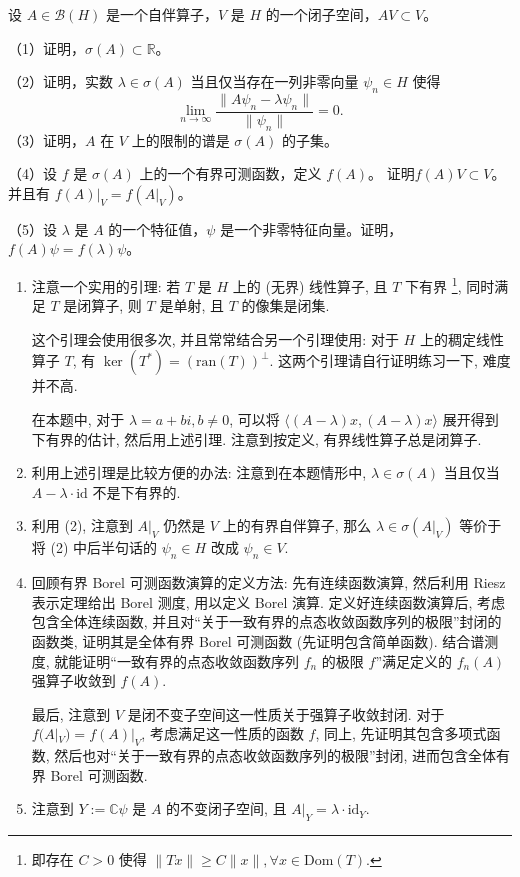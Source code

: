 \begin{3}
设 $A \in \mathcal{B}(H)$ 是一个自伴算子，$V$ 是 $H$ 的一个闭子空间，$A V \subset V$。

（1）证明，$\sigma(A) \subset \mathbb{R}$。

（2）证明，实数 $\lambda \in \sigma(A)$ 当且仅当存在一列非零向量 $\psi_{n} \in H$ 使得
$$\lim_{n \rightarrow \infty} \frac{\|A \psi_{n}-\lambda \psi_{n}\|}{\|\psi_{n}\|}=0.$$
（3）证明，$A$ 在 $V$ 上的限制的谱是 $\sigma(A)$ 的子集。

（4）设 $f$ 是 $\sigma(A)$ 上的一个有界可测函数，定义 $f(A)$。
证明$f(A) V \subset V$。并且有 $f(A)|_{V}=f(A|_{V})$。

（5）设 $\lambda$ 是 $A$ 的一个特征值，$\psi$ 是一个非零特征向量。证明，$f(A) \psi= f(\lambda) \psi$。
\end{3}
\begin{enumerate}
    \item[(1)] 注意一个实用的引理: 若 $T$ 是 $H$ 上的 (无界) 线性算子, 且 $T$ 下有界
    \footnote{即存在 $C>0$ 使得 $\|Tx\|\geqslant C\|x\|,\forall x\in\mathrm{Dom}(T)$.}, 同时满足 $T$ 是闭算子, 则 $T$ 是单射, 且 $T$ 的像集是闭集.
    
    这个引理会使用很多次, 并且常常结合另一个引理使用: 对于 $H$ 上的稠定线性算子 $T$, 有 $\ker(T^*)=(\mathrm{ran}(T))^\perp$. 这两个引理请自行证明练习一下, 难度并不高.

    在本题中, 对于 $\lambda=a+bi,b\not=0$, 可以将 $\langle(A-\lambda)x,(A-\lambda)x\rangle$ 展开得到下有界的估计, 然后用上述引理. 注意到按定义, 有界线性算子总是闭算子.

    \item[(2)] 利用上述引理是比较方便的办法: 注意到在本题情形中, $\lambda\in\sigma(A)$ 当且仅当 $A-\lambda \cdot\mathrm{id}$ 不是下有界的.
    \item[(3)] 利用 (2), 注意到 $A|_V$ 仍然是 $V$ 上的有界自伴算子, 
    那么 $\lambda\in\sigma(A|_V)$ 等价于将 (2) 中后半句话的 $\psi_n\in H$ 改成 $\psi_n\in V$.
    \item[(4)] 回顾有界 Borel 可测函数演算的定义方法: 先有连续函数演算, 然后利用 Riesz 表示定理给出 Borel 测度, 用以定义 Borel 演算. 
    定义好连续函数演算后, 考虑包含全体连续函数, 并且对“关于一致有界的点态收敛函数序列的极限”封闭的函数类, 
    证明其是全体有界 Borel 可测函数 (先证明包含简单函数). 
    结合谱测度, 就能证明“一致有界的点态收敛函数序列 $f_n$ 的极限 $f$”满足定义的 $f_n(A)$ 强算子收敛到 $f(A)$. 

    最后, 注意到 $V$ 是闭不变子空间这一性质关于强算子收敛封闭. 对于 $f(A|_V)=f(A)|_V$, 考虑满足这一性质的函数 $f$, 
    同上, 先证明其包含多项式函数, 然后也对“关于一致有界的点态收敛函数序列的极限”封闭, 进而包含全体有界 Borel 可测函数.
    \item[(5)] 注意到 $Y:=\mathbb{C}\psi$ 是 $A$ 的不变闭子空间, 且 $A|_Y=\lambda\cdot \mathrm{id}_Y$.
\end{enumerate}



